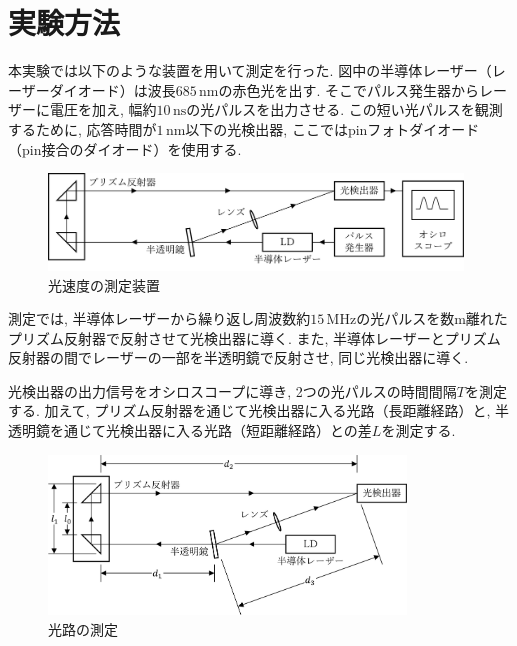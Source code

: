\documentclass{jarticle}
\begin{document}
\section{実験方法}



本実験では以下のような装置を用いて測定を行った.
図中の半導体レーザー（レーザーダイオード）は波長$685\,\mathrm{nm}$の赤色光を出す.
そこでパルス発生器からレーザーに電圧を加え, 幅約$10\,\mathrm{ns}$の光パルスを出力させる.
この短い光パルスを観測するために, 応答時間が$1\,\mathrm{nm}$以下の光検出器, ここではpinフォトダイオード（pin接合のダイオード）を使用する.

\begin{figure}[H]
  \begin{center}
    \includegraphics[width=110mm]{experimental_method_picture.png}
    \caption{光速度の測定装置}
  \end{center}
\end{figure}

測定では, 半導体レーザーから繰り返し周波数約$15\,\mathrm{MHz}$の光パルスを数$\mathrm{m}$離れたプリズム反射器で反射させて光検出器に導く.
また, 半導体レーザーとプリズム反射器の間でレーザーの一部を半透明鏡で反射させ, 同じ光検出器に導く.

光検出器の出力信号をオシロスコープに導き, 2つの光パルスの時間間隔$T$を測定する.
加えて, プリズム反射器を通じて光検出器に入る光路（長距離経路）と, 半透明鏡を通じて光検出器に入る光路（短距離経路）との差$L$を測定する.

\begin{figure}[H]
  \begin{center}
    \includegraphics[width=95mm]{experimental_distance_picture.png}
    \caption{光路の測定}
  \end{center}
\end{figure}
\end{document}
